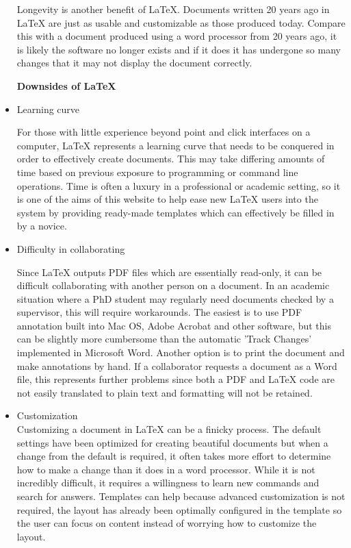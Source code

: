 \documentclass[12pt,letterpaper]{report}
\begin{document}
\begin{itemize}
Longevity is another benefit of LaTeX. Documents written 20 years ago in LaTeX are just as usable and customizable as those produced today. Compare this with a document produced using a word processor from 20 years ago, it is likely the software no longer exists and if it does it has undergone so many changes that it may not display the document correctly.

\textbf{Downsides of LaTeX}

\item Learning curve

For those with little experience beyond point and click interfaces on a computer, LaTeX represents a learning curve that needs to be conquered in order to effectively create documents. This may take differing amounts of time based on previous exposure to programming or command line operations. Time is often a luxury in a professional or academic setting, so it is one of the aims of this website to help ease new LaTeX users into the system by providing ready-made templates which can effectively be filled in by a novice.

\item Difficulty in collaborating

Since LaTeX outputs PDF files which are essentially read-only, it can be difficult collaborating with another person on a document. In an academic situation where a PhD student may regularly need documents checked by a supervisor, this will require workarounds. The easiest is to use PDF annotation built into Mac OS, Adobe Acrobat and other software, but this can be slightly more cumbersome than the automatic 'Track Changes' implemented in Microsoft Word. Another option is to print the document and make annotations by hand. If a collaborator requests a document as a Word file, this represents further problems since both a PDF and LaTeX code are not easily translated to plain text and formatting will not be retained.

\item Customization
\\Customizing a document in LaTeX can be a finicky process. The default settings have been optimized for creating beautiful documents but when a change from the default is required, it often takes more effort to determine how to make a change than it does in a word processor. While it is not incredibly difficult, it requires a willingness to learn new commands and search for answers. Templates can help because advanced customization is not required, the layout has already been optimally configured in the template so the user can focus on content instead of worrying how to customize the layout.


\end{itemize}
\end{document}
